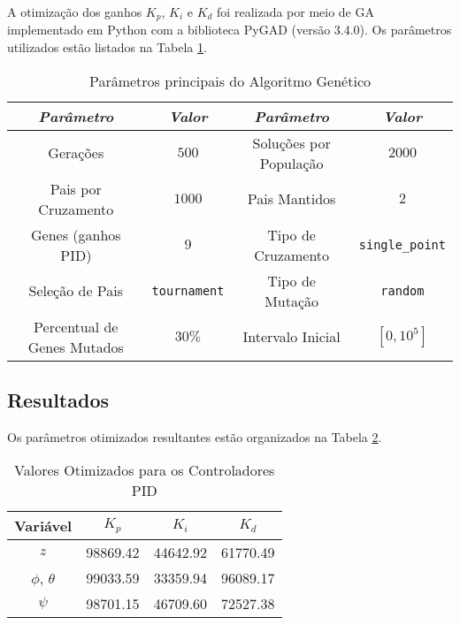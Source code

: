 A otimização dos ganhos $K_p$, $K_i$ e $K_d$ foi realizada por meio de GA implementado em Python 
com a biblioteca PyGAD (versão 3.4.0). Os parâmetros utilizados estão listados na Tabela 
\ref{tab:ga_params_summary}.
\vspace{-0.2cm}
\begin{table}[h!]
    \centering
    \caption{Parâmetros principais do Algoritmo Genético}
    \begin{tabular}{|c|c||c|c|}
        \hline
        \emph{Parâmetro} & \emph{Valor} & \emph{Parâmetro} & \emph{Valor} \\
        \hline
        Gerações & $500$ & Soluções por População & $2000$ \\
        \hline
        Pais por Cruzamento & $1000$ & Pais Mantidos & $2$ \\
        \hline
        Genes (ganhos PID) & $9$ & Tipo de Cruzamento & \texttt{single\_point} \\
        \hline
        Seleção de Pais & \texttt{tournament} & Tipo de Mutação & \texttt{random} \\
        \hline
        Percentual de Genes Mutados & $30\%$ & Intervalo Inicial & $[0, 10^5]$ \\
        \hline
    \end{tabular}
    \label{tab:ga_params_summary}
\end{table}

\subsection{Resultados}
Os parâmetros otimizados resultantes estão organizados na Tabela \ref{tab:pid_values}.
\begin{table}[h!]
    \centering
    \caption{Valores Otimizados para os Controladores PID}
    \label{tab:pid_values}
    \begin{tabular}{|c|c|c|c|}
        \hline
        \textbf{Variável} & \textbf{$K_p$} & \textbf{$K_i$} & \textbf{$K_d$} \\ \hline
        $z$              & 98869.42       & 44642.92       & 61770.49       \\ \hline
        $\phi$, $\theta$ & 99033.59       & 33359.94       & 96089.17       \\ \hline
        $\psi$           & 98701.15       & 46709.60       & 72527.38       \\ \hline
    \end{tabular}
\end{table}

